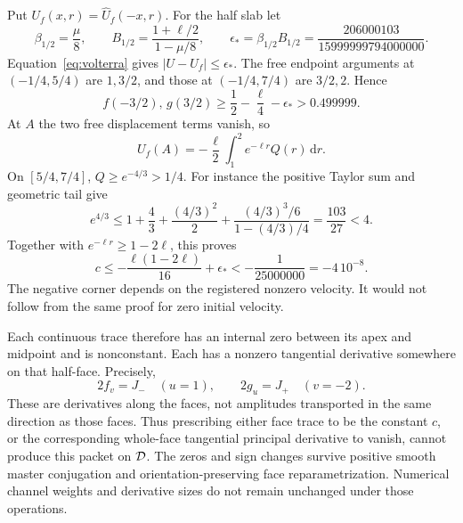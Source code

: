 \documentclass[11pt]{article}
\newcommand{\dd}{\,\mathrm d}
\begin{document}
Put $U_f(x,r)=\widehat U_f(-x,r)$. For the half slab let
\begin{equation}
 \beta_{1/2}=\frac\mu8,\qquad
 B_{1/2}=\frac{1+\ell/2}{1-\mu/8},\qquad
 \epsilon_*=\beta_{1/2}B_{1/2}
       =\frac{206000103}{15999999794000000}.
 \label{eq:eps}
\end{equation}
Equation~\eqref{eq:volterra} gives $|U-U_f|\le\epsilon_*$.
The free endpoint arguments at $(-1/4,5/4)$ are $1,3/2$, and those
at $(-1/4,7/4)$ are $3/2,2$. Hence
\begin{equation}
 f(-3/2),\,g(3/2)\ge\frac12-\frac\ell4-\epsilon_*
       >0.499999 .
 \label{eq:midpoints}
\end{equation}
At $A$ the two free displacement terms vanish, so
\[
 U_f(A)=-\frac\ell2\int_1^2 e^{-\ell r}Q(r)\dd r.
\]
On $[5/4,7/4]$, $Q\ge e^{-4/3}>1/4$. For instance the positive
Taylor sum and geometric tail give
\[
 e^{4/3}\le1+\frac43+\frac{(4/3)^2}{2}
       +\frac{(4/3)^3/6}{1-(4/3)/4}
       =\frac{103}{27}<4 .
\]
Together with $e^{-\ell r}\ge1-2\ell$, this proves
\begin{equation}
 c\le-\frac{\ell(1-2\ell)}{16}+\epsilon_*
       <-\frac1{25000000}=-4\,10^{-8}.
 \label{eq:corner}
\end{equation}
The negative corner depends on the registered nonzero velocity.
It would not follow from the same proof for zero initial velocity.

Each continuous trace therefore has an internal zero between its apex
and midpoint and is nonconstant. Each has a nonzero tangential derivative
somewhere on that half-face. Precisely,
\begin{equation}
 2f_v=J_-\quad(u=1),\qquad
 2g_u=J_+\quad(v=-2).
 \label{eq:factors}
\end{equation}
These are derivatives along the faces, not amplitudes transported in
the same direction as those faces.
Thus prescribing either face trace to be the constant $c$, or the
corresponding whole-face tangential principal derivative to vanish,
cannot produce this packet on $ {\cal D}$.
The zeros and sign changes survive positive smooth master conjugation
and orientation-preserving face reparametrization. Numerical channel
weights and derivative sizes do not remain unchanged under those operations.
\end{document}
